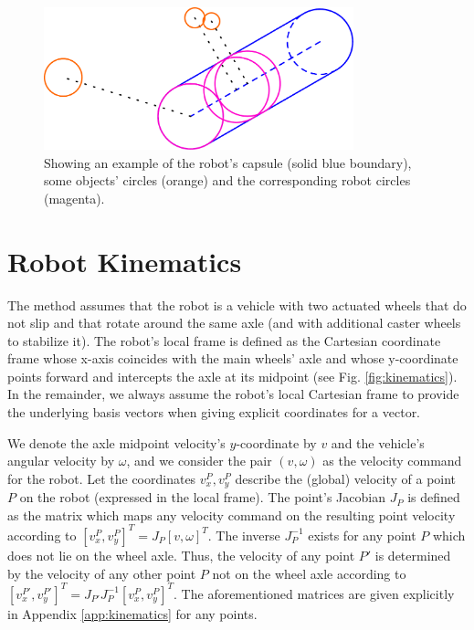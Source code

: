 \documentclass{article}
\begin{document}
\begin{figure}
	\begin{center}
		\includegraphics[width=0.8\textwidth]{geometric_objects_relations.pdf}
	\end{center}
	\caption{Showing an example of the robot's capsule (solid blue boundary), some objects' circles (orange) and the corresponding robot circles (magenta).}\label{fig:shapes}
\end{figure}

\section{Robot Kinematics}\label{sec:kinematics}

The method assumes that the robot is a vehicle with two actuated wheels that do not slip and that rotate around the same axle (and with additional caster wheels to stabilize it). The robot's local frame is defined as the Cartesian coordinate frame whose x-axis coincides with the main wheels' axle and whose y-coordinate points forward and intercepts the axle at its midpoint (see Fig. \ref{fig:kinematics}). In the remainder, we always assume the robot's local Cartesian frame to provide the underlying basis vectors when giving explicit coordinates for a vector.

We denote the axle midpoint velocity's $ y $-coordinate by $ v $ and the vehicle's angular velocity by $ \omega $, and we consider the pair $ (v,\omega) $ as the velocity command for the robot. Let the coordinates $ v_x^P, v_y^P $ describe the (global) velocity of a point $ P $ on the robot (expressed in the local frame). The point's Jacobian $ J_P $ is defined as the matrix which maps any velocity command on the resulting point velocity according to $ {[v_x^P, v_y^P]}^T =  J_P {[v, \omega]}^T $. The inverse $ J_P^{-1} $ exists for any point $ P $ which does not lie on the wheel axle. Thus, the velocity of any point $ P' $ is determined by the velocity of any other point $ P $ not on the wheel axle according to $ {[v_x^{P'}, v_y^{P'}]}^T = J_{P'} J_P^{-1} {[v_x^P, v_y^P]}^T $. The aforementioned matrices are given explicitly in Appendix \ref{app:kinematics} for any points.
\end{document}

